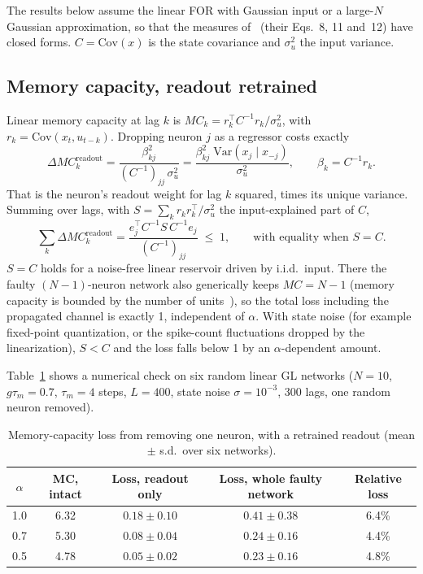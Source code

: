 \documentclass[11pt,a4paper]{article}
\newcommand{\Var}{\mathrm{Var}}
\newcommand{\Cov}{\mathrm{Cov}}
\begin{document}
The results below assume the linear FOR with Gaussian input or a large-$N$ Gaussian approximation, so that the measures of~\cite{mastin2026} (their Eqs.~8, 11 and~12) have closed forms. $C = \Cov(x)$ is the state covariance and $\sigma_u^2$ the input variance.

\subsection{Memory capacity, readout retrained}

Linear memory capacity at lag $k$ is $MC_k = r_k^{\top} C^{-1} r_k / \sigma_u^2$, with $r_k = \Cov(x_t, u_{t-k})$. Dropping neuron $j$ as a regressor costs exactly
\begin{equation}
\Delta MC_k^{\mathrm{readout}} = \frac{\beta_{kj}^{2}}{(C^{-1})_{jj}\,\sigma_u^{2}} = \frac{\beta_{kj}^{2}\; \Var(x_j \mid x_{-j})}{\sigma_u^{2}}, \qquad \beta_k = C^{-1} r_k.
\label{eq:dmc}
\end{equation}
That is the neuron's readout weight for lag $k$ squared, times its unique variance. Summing over lags, with $S = \sum_k r_k r_k^{\top} / \sigma_u^2$ the input-explained part of $C$,
\begin{equation}
\sum_k \Delta MC_k^{\mathrm{readout}} = \frac{e_j^{\top} C^{-1} S\, C^{-1} e_j}{(C^{-1})_{jj}} \;\le\; 1, \qquad \text{with equality when } S = C.
\label{eq:dmcsum}
\end{equation}
$S = C$ holds for a noise-free linear reservoir driven by i.i.d.\ input. There the faulty $(N-1)$-neuron network also generically keeps $MC = N-1$ (memory capacity is bounded by the number of units~\cite{jaeger2002}), so the total loss including the propagated channel is exactly 1, independent of $\alpha$. With state noise (for example fixed-point quantization, or the spike-count fluctuations dropped by the linearization), $S < C$ and the loss falls below 1 by an $\alpha$-dependent amount.

Table~\ref{tab:mc} shows a numerical check on six random linear GL networks ($N = 10$, $g\tau_m = 0.7$, $\tau_m = 4$ steps, $L = 400$, state noise $\sigma = 10^{-3}$, 300 lags, one random neuron removed).

\begin{table}[h]
\centering
\small
\begin{tabular}{@{}ccccc@{}}
\toprule
$\alpha$ & MC, intact & Loss, readout only & Loss, whole faulty network & Relative loss \\
\midrule
1.0 & 6.32 & $0.18 \pm 0.10$ & $0.41 \pm 0.38$ & 6.4\% \\
0.7 & 5.30 & $0.08 \pm 0.04$ & $0.24 \pm 0.16$ & 4.4\% \\
0.5 & 4.78 & $0.05 \pm 0.02$ & $0.23 \pm 0.16$ & 4.8\% \\
\bottomrule
\end{tabular}
\caption{Memory-capacity loss from removing one neuron, with a retrained readout (mean $\pm$ s.d.\ over six networks).}
\label{tab:mc}
\end{table}
\end{document}
